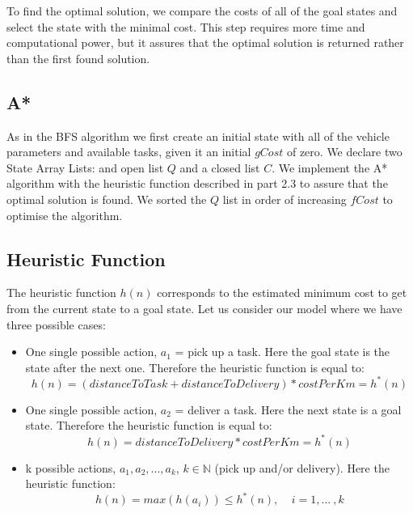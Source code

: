 \documentclass[11pt]{article}
\newcommand{\N}{\mathbb{N}}
\begin{document}
To find the optimal solution, we compare the costs of all of the goal states and select the state with the minimal cost. This step requires more time and computational power, but it assures that the optimal solution is returned rather than the first found solution.

\subsection{A*}
\indent \indent As in the BFS algorithm we first create an initial state with all of the vehicle parameters and available tasks, given it an initial $gCost$ of zero. We declare two State Array Lists: and open list $Q$ and a closed list $C$. We implement the A* algorithm with the heuristic function described in part 2.3 to assure that the optimal solution is found. We sorted the $Q$ list in order of increasing $fCost$ to optimise the algorithm.

\subsection{Heuristic Function}
\indent \indent The heuristic function $h(n)$ corresponds to the estimated minimum cost to get from the current state to a goal state. Let us consider our model where we have three possible cases:

\begin{itemize}
    \item One single possible action, $a_1$ = pick up a task. Here the goal state is the state after the next one. Therefore the heuristic function is equal to: 
        \begin{equation}
            h(n) = (distanceToTask + distanceToDelivery)*costPerKm = h^*(n)
        \end{equation}
    \item One single possible action, $a_2$ = deliver a task. Here the next state is a goal state. Therefore the heuristic function is equal to: 
        \begin{equation}
            h(n) = distanceToDelivery*costPerKm = h^*(n)
        \end{equation}
    \item k possible actions, $a_1, a_2, ..., a_k$, $k\in \N$ (pick up and/or delivery). Here the heuristic function: 
        \begin{equation}
            h(n) = max(h(a_i)) \leq h^*(n), \: \: \: \: \: i= 1, ... \:, k
        \end{equation}
\end{itemize}
\end{document}
